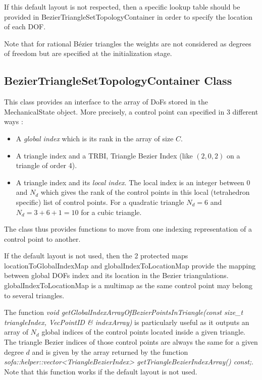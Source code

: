 \documentclass[a4paper,11pt]{article}
\newcommand{\Bezier}{{B{\'e}zier }}
\newcommand{\ncontrols}{{C}}
\newcommand{\degree}{{d}}
\begin{document}
If this default layout is not respected, then a specific lookup table should be provided in BezierTriangleSetTopologyContainer in order to specify the location of each DOF.

Note that for rational \Bezier triangles the weights are not considered as degrees of freedom but are specified at the initialization stage.

\subsection{BezierTriangleSetTopologyContainer Class}

This class provides an interface to the array of DoFs stored in the MechanicalState object. More precisely, a control point can specified in 3 different ways :

\begin{itemize}
	\item A {\em global index} which is its rank in the array of size $\ncontrols$.
	\item A triangle index and a  TRBI, Triangle  Bezier Index (like $(2,0,2)$ on a triangle of order 4).
	\item A triangle index and its {\em local index}. The local index is an integer between 0 and $N_\degree$ which gives the rank of the control points in this local (tetrahedron specific) list of control points. For a quadratic triangle $N_d=6$ and $N_d=3+6+1=10$ for a cubic triangle.
 \end{itemize}
The class thus provides functions to move from one indexing representation of a control point to another.

If the default layout is not used, then the 2 protected maps locationToGlobalIndexMap and globalIndexToLocationMap provide the mapping between global DOFs index and its location in the Bezier triangulations. globalIndexToLocationMap is a multimap as the same control point may belong to several triangles.

The function {\it void getGlobalIndexArrayOfBezierPointsInTriangle(const size\_t triangleIndex, VecPointID \& indexArray) } is particularly useful as it outputs an array of $N_\degree$ global indices of the control points located inside a given triangle. The triangle  Bezier indices of those control points are always the same for a given degree $\degree$ and is given by the array returned by the function {\it sofa::helper::vector<TriangleBezierIndex> getTriangleBezierIndexArray() const;}. Note that this function works if the default layout is not used. 
\end{document}
